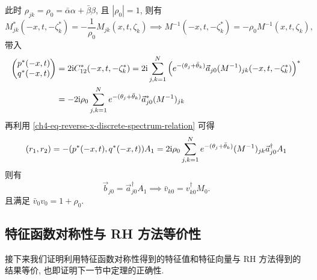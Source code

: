 此时 $\rho_{jk} = \rho_{0} = \bar{\alpha} \alpha + \bar{\beta} \beta$, 且 $|\rho_{0}| = 1$, 则有
\begin{equation}
    M_{jk}^{*}(-x,t, -\zeta_{k}^{*}) = - \frac{1}{\rho_{0}} M_{jk}(x,t,\zeta_{k}) \implies M^{-1}(-x,t,-\zeta_{k}^{*}) = - \rho_{0} M^{-1}(x,t,\zeta_{k}),
\end{equation}
带入
\begin{equation}
    \begin{aligned}
        \begin{pmatrix}
            p^{*}(-x,t) \\ q^{*}(-x,t)
        \end{pmatrix} & = 2 \mathrm{i} C_{12}^{*}(-x,t,-\zeta_{k}^{*}) = 2 \mathrm{i} \sum_{j,k=1}^{N}\left( e^{-(\theta_{j} + \bar{\theta}_{k})} \vec{a}_{j0} (M^{-1})_{jk}(-x,t,-\zeta_{k}^{*}) \right)^{*} \\
                                   & = - 2 \mathrm{i} \rho_{0} \sum_{j,k=1}^{N} e^{-(\theta_{j} + \bar{\theta}_{k})} \vec{a}_{j0}^{*} (M^{-1})_{jk}
    \end{aligned}
\end{equation}
再利用 \eqref{ch4-eq-reverse-x-discrete-spectrum-relation} 可得
\begin{equation}
    (r_{1}, r_{2}) = - (p^{*}(-x,t), q^{*}(-x,t)) A_{1} = 2 \mathrm{i} \rho_{0} \sum_{j,k=1}^{N} e^{-(\theta_{j} + \bar{\theta}_{k})} (M^{-1})_{jk} \vec{a}_{j0}^{\dagger} A_{1}
\end{equation}
则有
\begin{equation}
    \vec{b}_{j0} = \vec{a}_{j0}^{\dagger} A_{1} \implies \bar{v}_{k0} = v_{k0}^{\dagger} M_{0}.
\end{equation}
且满足 $\bar{v}_{0} v_{0} = 1+\rho_{0}$.
\subsection{特征函数对称性与 RH 方法等价性}
接下来我们证明利用特征函数对称性得到的特征值和特征向量与 RH 方法得到的结果等价, 也即证明下一节中定理的正确性.

